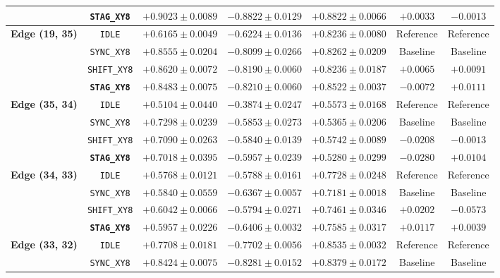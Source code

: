 \documentclass[twocolumn,aps,pra,superscriptaddress,showpacs,floatfix]{revtex4-2}
\begin{document}
\begin{table}[t]
\begin{tabular}{lcccccc}
& \textbf{\texttt{STAG\_XY8}} & $\mathbf{+0.9023 \pm 0.0089}$ & $-0.8822 \pm 0.0129$ & $+0.8822 \pm 0.0066$ & $\mathbf{+0.0033}$ & $-0.0013$ \\
\midrule
\textbf{Edge (19, 35)} & \texttt{IDLE} & $+0.6165 \pm 0.0049$ & $-0.6224 \pm 0.0136$ & $+0.8236 \pm 0.0080$ & Reference & Reference \\
& \texttt{SYNC\_XY8} & $+0.8555 \pm 0.0204$ & $-0.8099 \pm 0.0266$ & $+0.8262 \pm 0.0209$ & Baseline & Baseline \\
& \texttt{SHIFT\_XY8} & $\mathbf{+0.8620 \pm 0.0072}$ & $-0.8190 \pm 0.0060$ & $+0.8236 \pm 0.0187$ & $+0.0065$ & $+0.0091$ \\
& \textbf{\texttt{STAG\_XY8}} & $+0.8483 \pm 0.0075$ & $\mathbf{-0.8210 \pm 0.0060}$ & $+0.8522 \pm 0.0037$ & $-0.0072$ & $\mathbf{+0.0111}$ \\
\midrule
\textbf{Edge (35, 34)} & \texttt{IDLE} & $+0.5104 \pm 0.0440$ & $-0.3874 \pm 0.0247$ & $+0.5573 \pm 0.0168$ & Reference & Reference \\
& \texttt{SYNC\_XY8} & $\mathbf{+0.7298 \pm 0.0239}$ & $-0.5853 \pm 0.0273$ & $+0.5365 \pm 0.0206$ & Baseline & Baseline \\
& \texttt{SHIFT\_XY8} & $+0.7090 \pm 0.0263$ & $-0.5840 \pm 0.0139$ & $+0.5742 \pm 0.0089$ & $-0.0208$ & $-0.0013$ \\
& \textbf{\texttt{STAG\_XY8}} & $+0.7018 \pm 0.0395$ & $\mathbf{-0.5957 \pm 0.0239}$ & $+0.5280 \pm 0.0299$ & $-0.0280$ & $\mathbf{+0.0104}$ \\
\midrule
\textbf{Edge (34, 33)} & \texttt{IDLE} & $+0.5768 \pm 0.0121$ & $-0.5788 \pm 0.0161$ & $+0.7728 \pm 0.0248$ & Reference & Reference \\
& \texttt{SYNC\_XY8} & $+0.5840 \pm 0.0559$ & $-0.6367 \pm 0.0057$ & $+0.7181 \pm 0.0018$ & Baseline & Baseline \\
& \texttt{SHIFT\_XY8} & $\mathbf{+0.6042 \pm 0.0066}$ & $-0.5794 \pm 0.0271$ & $+0.7461 \pm 0.0346$ & $+0.0202$ & $-0.0573$ \\
& \textbf{\texttt{STAG\_XY8}} & $+0.5957 \pm 0.0226$ & $\mathbf{-0.6406 \pm 0.0032}$ & $+0.7585 \pm 0.0317$ & $\mathbf{+0.0117}$ & $\mathbf{+0.0039}$ \\
\midrule
\textbf{Edge (33, 32)} & \texttt{IDLE} & $+0.7708 \pm 0.0181$ & $-0.7702 \pm 0.0056$ & $+0.8535 \pm 0.0032$ & Reference & Reference \\
& \texttt{SYNC\_XY8} & $\mathbf{+0.8424 \pm 0.0075}$ & $-0.8281 \pm 0.0152$ & $+0.8379 \pm 0.0172$ & Baseline & Baseline \\

\end{tabular}
\end{table}
\end{document}
